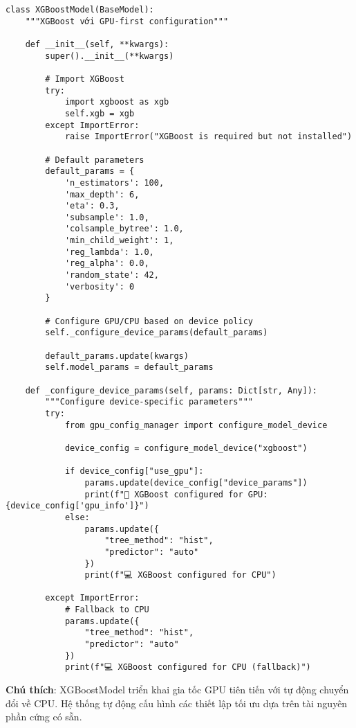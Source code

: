 \begin{verbatim}
class XGBoostModel(BaseModel):
    """XGBoost với GPU-first configuration"""
    
    def __init__(self, **kwargs):
        super().__init__(**kwargs)
        
        # Import XGBoost
        try:
            import xgboost as xgb
            self.xgb = xgb
        except ImportError:
            raise ImportError("XGBoost is required but not installed")
            
        # Default parameters
        default_params = {
            'n_estimators': 100,
            'max_depth': 6,
            'eta': 0.3,
            'subsample': 1.0,
            'colsample_bytree': 1.0,
            'min_child_weight': 1,
            'reg_lambda': 1.0,
            'reg_alpha': 0.0,
            'random_state': 42,
            'verbosity': 0
        }
        
        # Configure GPU/CPU based on device policy
        self._configure_device_params(default_params)
        
        default_params.update(kwargs)
        self.model_params = default_params
        
    def _configure_device_params(self, params: Dict[str, Any]):
        """Configure device-specific parameters"""
        try:
            from gpu_config_manager import configure_model_device
            
            device_config = configure_model_device("xgboost")
            
            if device_config["use_gpu"]:
                params.update(device_config["device_params"])
                print(f"🚀 XGBoost configured for GPU: {device_config['gpu_info']}")
            else:
                params.update({
                    "tree_method": "hist",
                    "predictor": "auto"
                })
                print(f"💻 XGBoost configured for CPU")
                
        except ImportError:
            # Fallback to CPU
            params.update({
                "tree_method": "hist",
                "predictor": "auto"
            })
            print(f"💻 XGBoost configured for CPU (fallback)")
\end{verbatim}

\textbf{Chú thích}: XGBoostModel triển khai gia tốc GPU tiên tiến với tự động chuyển đổi về CPU. Hệ thống tự động cấu hình các thiết lập tối ưu dựa trên tài nguyên phần cứng có sẵn.

